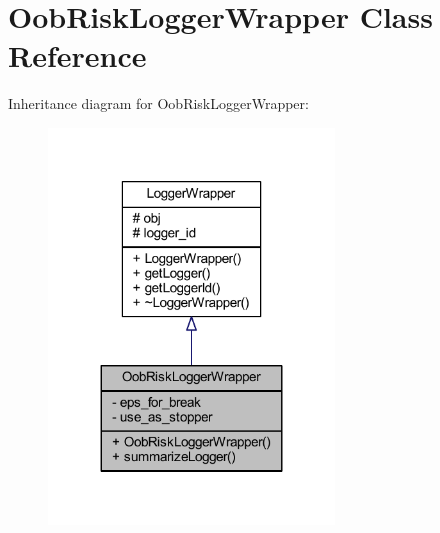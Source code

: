 \hypertarget{class_oob_risk_logger_wrapper}{}\section{Oob\+Risk\+Logger\+Wrapper Class Reference}
\label{class_oob_risk_logger_wrapper}


Inheritance diagram for Oob\+Risk\+Logger\+Wrapper\+:\nopagebreak
\begin{figure}[H]
\begin{center}
\leavevmode
\includegraphics[width=215pt]{class_oob_risk_logger_wrapper__inherit__graph}
\end{center}
\end{figure}


